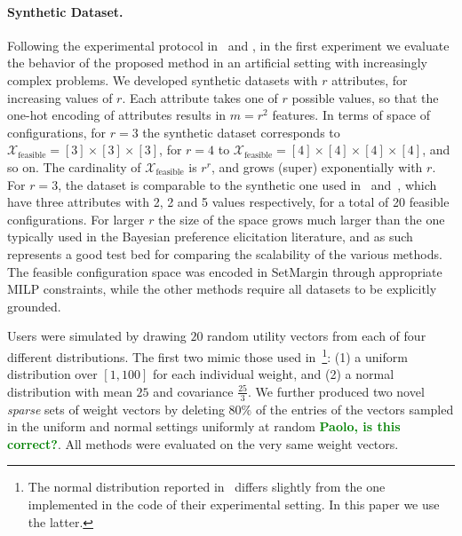 \documentclass{article}
\renewcommand\[{\begin{equation}}
\renewcommand\]{\end{equation}}
\newcommand{\calvar}[1]{\ensuremath{\mathcal{#1}}}
\newcommand{\calX}{\calvar{X}}
\newcommand{\stefano}[1]{{\bf \textcolor{green}{{\fbox{Stefano:} #1}}}}
\begin{document}
\paragraph{Synthetic Dataset.} Following the experimental protocol
in~\cite{guo2010real} and \cite{viappiani2010optimal}, in the first
experiment we evaluate the behavior of the proposed method in an
artificial setting with increasingly complex problems. We developed
synthetic datasets with $r$ attributes, for increasing values of $r$.
Each attribute takes one of $r$ possible values, so that the one-hot
encoding of attributes results in $m=r^2$ features. In terms of space
of configurations, for $r=3$ the synthetic dataset corresponds to 
$\calX_\text{feasible} = [3] \times [3] \times [3]$, for $r=4$ to
$\calX_\text{feasible} = [4] \times [4] \times [4] \times [4]$, and so on. The
cardinality of $\calX_\text{feasible}$ is $r^r$, and grows (super)
exponentially with $r$.
For $r=3$, the dataset is comparable to the synthetic one used
in~\cite{guo2010real} and~\cite{viappiani2010optimal}, which have
three attributes with 2, 2 and 5 values respectively, for a total of
20 feasible configurations.  For larger $r$ the size of the space
grows much larger than the one typically used in the Bayesian
preference elicitation literature, and as such represents a good test
bed for comparing the scalability of the various methods. The feasible
configuration space was encoded in {\sc SetMargin} through appropriate
MILP constraints, while the other methods require all datasets to be
explicitly grounded.

Users were simulated by drawing $20$ random utility vectors from each of four
different distributions. The first two mimic those used
in~\cite{guo2010real}\footnote{The normal distribution reported
in~\cite{guo2010real} differs slightly from the one implemented in the code of
their experimental setting. In this paper we use the latter.}:
(1) a uniform distribution over $[1, 100]$ for each individual weight, and (2)
a normal distribution with mean $25$ and covariance
$\frac{25}{3}$.  We further produced two novel
{\em sparse} sets of weight vectors by deleting $80\%$ of the entries of the
vectors sampled in the uniform and normal settings uniformly at random
\stefano{Paolo, is this correct?}. All methods were evaluated on the very same
weight vectors.
\end{document}
